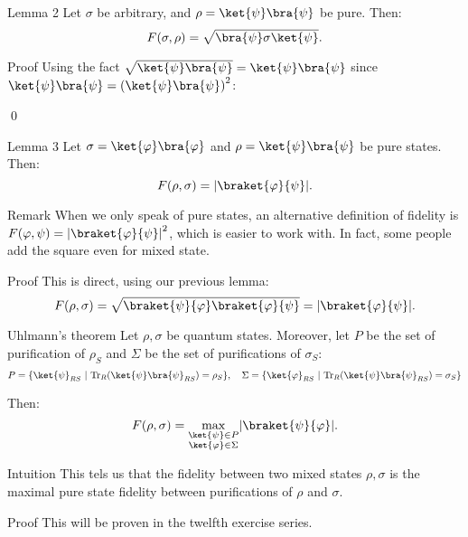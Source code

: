 \documentclass[a4paper]{article}
\begin{document}
\begin{parag}{Lemma 2}
    Let $\sigma$ be arbitrary, and $\rho = \ket{\psi}\bra{\psi}$ be pure. Then: 
    \[F\left(\sigma, \rho\right) = \sqrt{\bra{\psi} \sigma \ket{\psi}}.\]

    \begin{subparag}{Proof}
        Using the fact $\sqrt{\ket{\psi}\bra{\psi}} = \ket{\psi}\bra{\psi}$ since $\ket{\psi}\bra{\psi} = \left(\ket{\psi}\bra{\psi}\right)^2$: 

        \qed
    \end{subparag}
\end{parag}

\begin{parag}{Lemma 3}
    Let $\sigma = \ket{\phi}\bra{\phi}$ and $\rho = \ket{\psi}\bra{\psi}$ be pure states. Then: 
    \[F\left(\rho, \sigma\right) = \left|\braket{\phi}{\psi}\right|.\]

    \begin{subparag}{Remark}
        When we only speak of pure states, an alternative definition of fidelity is $F\left(\phi, \psi\right) = \left|\braket{\phi}{\psi}\right|^2$, which is easier to work with. In fact, some people add the square even for mixed state.
    \end{subparag}

    \begin{subparag}{Proof}
        This is direct, using our previous lemma:
        \[F\left(\rho, \sigma\right) = \sqrt{\braket{\psi}{\phi} \braket{\phi}{\psi}} = \left|\braket{\phi}{\psi}\right|.\]
    \end{subparag}
\end{parag}


\begin{parag}{Uhlmann's theorem}
    Let $\rho, \sigma$ be quantum states. Moreover, let $P$ be the set of purification of $\rho_S$ and $\Sigma$ be the set of purifications of $\sigma_S$:
    \[P = \left\{\ket{\psi}_{RS} \suchthat \Tr_R\left(\ket{\psi}\bra{\psi}_{RS}\right) = \rho_S\right\}, \mathspace \Sigma = \left\{\ket{\phi}_{RS} \suchthat \Tr_R\left(\ket{\psi}\bra{\psi}_{RS}\right) = \sigma_S\right\}\]

    Then:
    \[F\left(\rho, \sigma\right) = \max_{\substack{\ket{\psi} \in P \\ \ket{\phi} \in \Sigma}} \left|\braket{\psi}{\phi}\right|.\]
    
    \begin{subparag}{Intuition}
        This tels us that the fidelity between two mixed states $\rho, \sigma$ is the maximal pure state fidelity between purifications of $\rho$ and $\sigma$.
    \end{subparag}

    \begin{subparag}{Proof}
        This will be proven in the twelfth exercise series.
    \end{subparag}
\end{parag}
\end{document}
